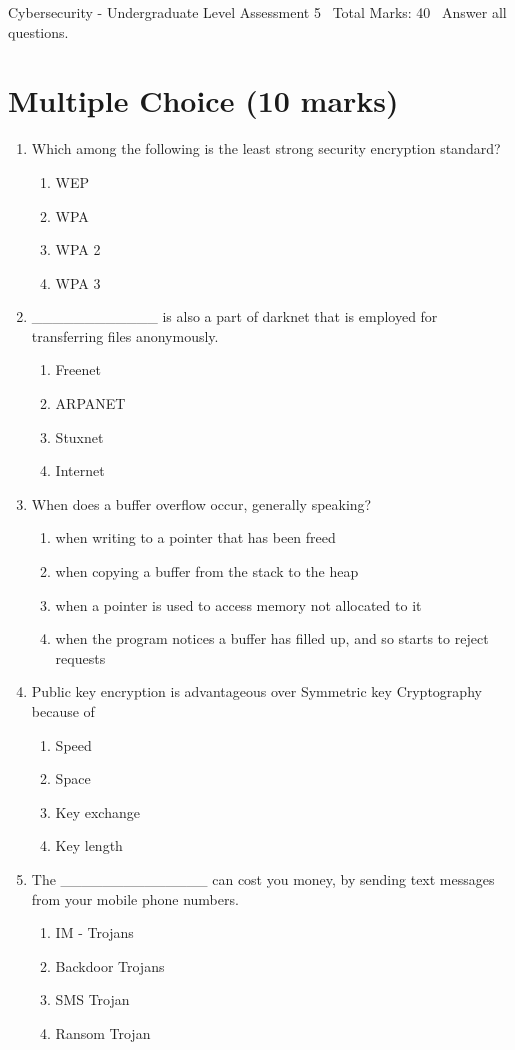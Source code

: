 \documentclass[12pt]{article}
\begin{document}
\begin{center}
Cybersecurity - Undergraduate Level Assessment 5 \
Total Marks: 40 \
Answer all questions.
\end{center}

\section*{Multiple Choice (10 marks)}
\begin{enumerate}[label=\arabic*.]
\item Which among the following is the least strong security encryption standard?
\begin{enumerate}[label=(\alph*)]
    \item WEP
    \item WPA
    \item WPA 2
    \item WPA 3
\end{enumerate}
\item \_\_\_\_\_\_\_\_\_\_\_\_ is also a part of darknet that is employed for transferring files anonymously.
\begin{enumerate}[label=(\alph*)]
    \item Freenet
    \item ARPANET
    \item Stuxnet
    \item Internet
\end{enumerate}
\item When does a buffer overflow occur, generally speaking?
\begin{enumerate}[label=(\alph*)]
    \item when writing to a pointer that has been freed
    \item when copying a buffer from the stack to the heap
    \item when a pointer is used to access memory not allocated to it
    \item when the program notices a buffer has filled up, and so starts to reject requests
\end{enumerate}
\item Public key encryption is advantageous over Symmetric key Cryptography because of
\begin{enumerate}[label=(\alph*)]
    \item Speed
    \item Space
    \item Key exchange
    \item Key length
\end{enumerate}
\item The \_\_\_\_\_\_\_\_\_\_\_\_\_\_ can cost you money, by sending text messages from your mobile phone numbers.
\begin{enumerate}[label=(\alph*)]
    \item IM - Trojans
    \item Backdoor Trojans
    \item SMS Trojan
    \item Ransom Trojan
\end{enumerate}
\end{enumerate}
\end{document}
